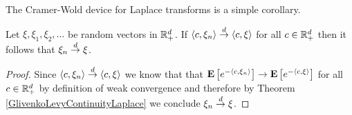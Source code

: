 The Cramer-Wold device for Laplace transforms is a simple corollary.
\begin{cor}\label{CramerWoldDeviceLaplace}Let $\xi, \xi_1, \xi_2, \dotsc$ be 
  random vectors in $\mathbb{R}^d_+$.  If $\langle c, \xi_n \rangle
  \overset{d}\to \langle c, \xi \rangle$ for all $c \in \mathbb{R}^d_+$ then it
  follows that $\xi_n \overset{d}\to \xi$.
\end{cor}
\begin{proof}
Since  $\langle c, \xi_n \rangle  \overset{d}\to \langle c, \xi \rangle$ we
know that that $\textbf{E}\left[e^{-\langle c, \xi_n \rangle } \right] \to
\textbf{E}\left[e^{-\langle c, \xi \rangle}\right]$ for all $c \in \mathbb{R}^d_+$
by definition of weak convergence
and therefore by Theorem \ref{GlivenkoLevyContinuityLaplace} we
conclude $\xi_n \overset{d}\to \xi$.
\end{proof}